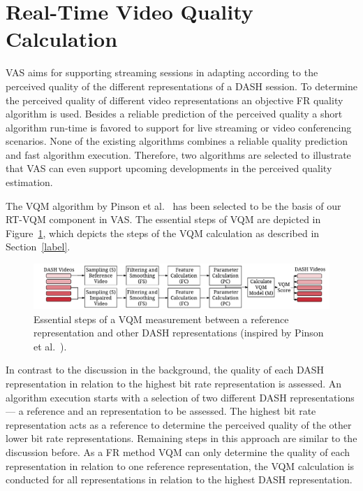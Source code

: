 \section{Real-Time Video Quality Calculation}
\label{sec:723_QualityCalculation}
\ac{VAS} aims for supporting streaming sessions in adapting according to the perceived quality of the different representations of a \ac{DASH} session.
To determine the perceived quality of different video representations an objective \ac{FR} quality algorithm is used.
Besides a reliable prediction of the perceived quality a short algorithm run-time is favored to support for live streaming or video conferencing scenarios.
None of the existing algorithms combines a reliable quality prediction and fast algorithm execution.
Therefore, two algorithms are selected to illustrate that \ac{VAS} can even support upcoming developments in the perceived quality estimation.

The \ac{VQM} algorithm by Pinson et al.~\cite{Pinson2004} has been selected to be the basis of our \ac{RT-VQM} component in \ac{VAS}.
The essential steps of \ac{VQM} are depicted in Figure~\ref{fig:720_vqmsteps}, which depicts the steps of the \ac{VQM} calculation as described in Section~\ref{label}.
\begin{figure}[t]
	\centering
	\includegraphics[width=\textwidth]{./gfx/700_VAS/VQMDash}
	\caption{Essential steps of a VQM measurement between a reference representation and other DASH representations (inspired by Pinson et al.~\cite{Pinson2004}).}
	\label{fig:720_vqmsteps}
\end{figure}
In contrast to the discussion in the background, the quality of each \ac{DASH} representation in relation to the highest bit rate representation is assessed.
An algorithm execution starts with a selection of two different \ac{DASH} representations --- a reference and an representation to be assessed.
The highest bit rate representation acts as a reference to determine the perceived quality of the other lower bit rate representations.
Remaining steps in this approach are similar to the discussion before.
As a FR method \ac{VQM} can only determine the quality of each representation in relation to one reference representation, the \ac{VQM} calculation is conducted for all representations in relation to the highest \ac{DASH} representation.

